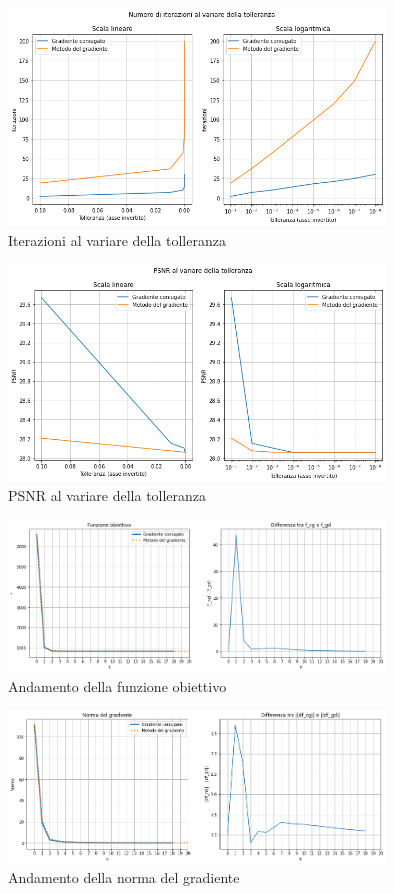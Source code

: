 \documentclass[11pt]{article}
\begin{document}
\begin{figure}[H]
    \centering
    \includegraphics[width=10cm]{iterazioni_cg_gd/2/tol_iter.png}
    \caption{Iterazioni al variare della tolleranza}
    \label{fig:tol_iter2}
\end{figure}
\begin{figure}[H]
    \centering
    \includegraphics[width=10cm]{iterazioni_cg_gd/2/tol_psnr.png}
    \caption{PSNR al variare della tolleranza}
    \label{fig:tol_psnr2}
\end{figure}
\begin{figure}[H]
    \centering
    \includegraphics[width=10cm]{iterazioni_cg_gd/2/funzione_obiettivo.png}
    \caption{Andamento della funzione obiettivo}
    \label{fig:obiettivo2}
\end{figure}
\begin{figure}[H]
    \centering
    \includegraphics[width=10cm]{iterazioni_cg_gd/2/norma_gradiente.png}
    \caption{Andamento della norma del gradiente}
    \label{fig:gradiente2}
\end{figure}
\end{document}
